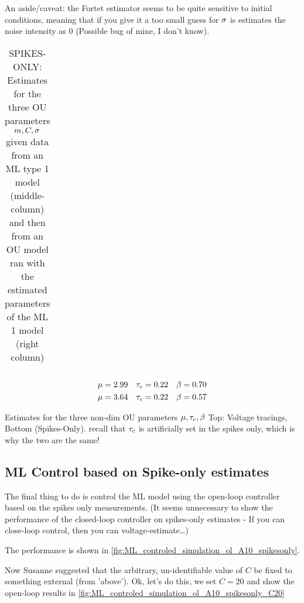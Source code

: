 \documentclass{article}
\begin{document}
An aside/caveat: the Fortet estimator seems to be quite sensitive to
initial conditions, meaning that if you give it a too small guess for ${\sigma }$ is estimates
the noise intensity as $0$ (Possible bug of mine, I don't know).
\begin{table}
\begin{tabular}{l|c}

\end{tabular}
\caption{SPIKES-ONLY: Estimates for the three OU parameters $m, C, {\sigma }$ given
data from an ML type 1 model (middle-column) and then from an OU model ran with the estimated
parameters of the ML 1 model (right column)}
\label{tab:OU_from_ML1spikes_ests}
\end{table}

\begin{table}
\begin{align*}
\mu &= 2.99 &{ \tau_{c} } &= 0.22 &\beta &= 0.70
\\
\mu &=3.64  &{ \tau_{c} } &= 0.22  &\beta &= 0.57
\end{align*} 
\caption{Estimates for the three non-dim OU parameters $\mu , { \tau_{c} } ,\beta$
Top: Voltage tracings, Bottom (Spikes-Only). recall that ${ \tau_{c} }$ is artificially
set in the spikes only, which is why the two are the same!}
\label{tab:OU_nondim_voltage_vs_spikesonly}
\end{table}

\subsection{ML Control based on Spike-only estimates}
The final thing to do is control the ML model using the open-loop controller
based on the spikes only measurements. (It seems unnecessary to show the
performance of the closed-loop controller on spikes-only estimates - If you
can close-loop control, then you can voltage-estimate\ldots)

The performance is shown in
\cref{fig:ML_controled_simulation_ol_A10_spikesonly}. 

Now Susanne suggested that the arbitrary, un-identifiable value of $C$ be fixed
to something external (from 'above'). Ok, let's do this, we set $C=20$ and show
the open-loop results in
\cref{fig:ML_controled_simulation_ol_A10_spikesonly_C20}
\end{document}
